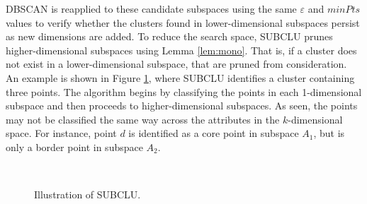 DBSCAN is reapplied to these candidate subspaces using the same $\varepsilon$ and $minPts$ values to verify whether the clusters found in lower-dimensional subspaces persist as new dimensions are added. To reduce the search space, SUBCLU prunes higher-dimensional subspaces using Lemma \ref{lem:mono}. That is, if a cluster does not exist in a lower-dimensional subspace, that are pruned from consideration. An example is shown in Figure \ref{fig:subclu}, where SUBCLU identifies a cluster containing three points. The algorithm begins by classifying the points in each 1-dimensional subspace and then proceeds to higher-dimensional subspaces. As seen, the points may not be classified the same way across the attributes in the $k$-dimensional space. For instance, point $d$ is identified as a core point in subspace $A_1$, but is only a border point in subspace $A_2$.
\begin{figure}[H]
    \vspace*{-0.7cm}
    \centering
    ~~~~
    ~
    \caption{Illustration of SUBCLU.}
    \label{fig:subclu}
    \vspace*{-0.7cm}
\end{figure}